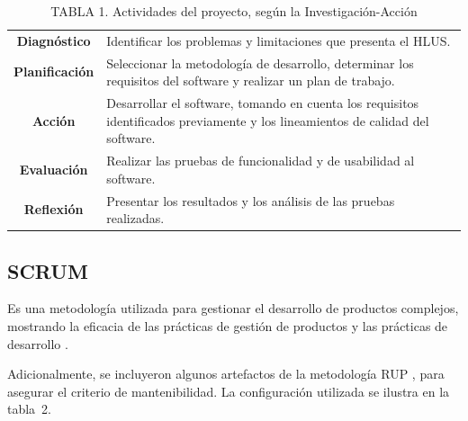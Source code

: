 \documentclass[conference]{IEEEtran}
\begin{document}
		\FloatBarrier %
		\begin{table}[htb]
			\caption{TABLA 1. Actividades del proyecto, seg\'{u}n la Investigaci\'{o}n-Acci\'{o}n}
			\label{tabla_1}
			\centering
			\setlength{\extrarowheight}{2.5pt}
			\begin{tabulary}{8.8cm}{|c|J|}
				\hline
				 & \\ \hline
				\textbf{Diagn\'{o}stico} & Identificar los problemas y limitaciones que presenta el HLUS.\\ \hline
				\textbf{Planificaci\'{o}n} & Seleccionar la metodolog\'{i}a de desarrollo, determinar los requisitos del software y realizar un plan de trabajo.
\\ \hline
				\textbf{Acci\'{o}n} & Desarrollar el software, tomando en cuenta los requisitos identificados previamente y los lineamientos de calidad del software.\\ \hline
				\textbf{Evaluaci\'{o}n} & Realizar las pruebas de funcionalidad y de usabilidad al software.\\ \hline
				\textbf{Reflexi\'{o}n} & Presentar los resultados y los an\'{a}lisis de las pruebas realizadas.\\ \hline
			\end{tabulary}
		\end{table}
		\FloatBarrier %


	\subsection{SCRUM}
		Es una metodolog\'{i}a utilizada para gestionar el desarrollo de productos complejos, mostrando la eficacia de las pr\'{a}cticas de gesti\'{o}n de productos y las pr\'{a}cticas de desarrollo \cite{Schwaber&Sutherland}.

		Adicionalmente, se incluyeron algunos artefactos de la metodolog\'{i}a RUP \cite{Kroll&Kruchten}, para asegurar el criterio de mantenibilidad. La configuraci\'{o}n utilizada se ilustra en la \mbox{tabla 2}.
\end{document}
